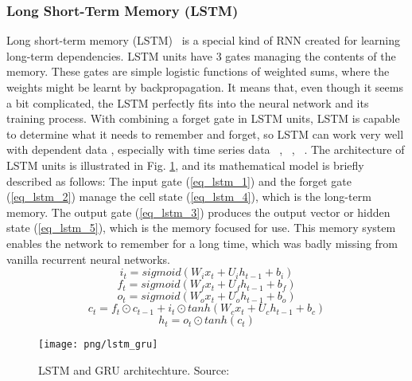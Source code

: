 \documentclass[../main.tex]{subfiles}
\begin{document}
\subsubsection{Long Short-Term Memory (LSTM)}
	Long short-term memory (LSTM)~\cite{hochreiter1997long} is a special kind of RNN created for learning long-term dependencies. LSTM units have 3 gates managing the contents of the memory. These gates are simple logistic functions of weighted sums, where the weights might be learnt by backpropagation. It means that, even though it seems a bit complicated, the LSTM perfectly fits into the neural network and its training process. With combining a forget gate in LSTM units, LSTM is capable to determine what it needs to remember and forget, so LSTM can work very well with dependent data , especially with time series data ~\cite{gers2002applying}, ~\cite{guo2016robust}, ~\cite{fu2016using}. The architecture of LSTM units is illustrated in Fig. \ref{model_lstm_gru}, and its mathematical model is briefly described as follows:
	 The input gate (\ref{eq_lstm_1}) and the forget gate (\ref{eq_lstm_2}) manage the cell state (\ref{eq_lstm_4}), which is the long-term memory. The output gate (\ref{eq_lstm_3}) produces the output vector or hidden state (\ref{eq_lstm_5}), which is the memory focused for use. This memory system enables the network to remember for a long time, which was badly missing from vanilla recurrent neural networks. 
\begin{equation}\label{eq_lstm_1}
i_t = sigmoid(W_ix_t + U_ih_{t-1}+b_i)
\end{equation}
\begin{equation}\label{eq_lstm_2}
f_t = sigmoid(W_fx_t + U_fh_{t-1}+b_f)
\end{equation}
\begin{equation}\label{eq_lstm_3}
o_t = sigmoid(W_ox_t + U_oh_{t-1}+b_o)
\end{equation}
\begin{equation}\label{eq_lstm_4}
c_t = f_t \odot c_{t-1} + i_t \odot tanh(W_cx_t + U_ch_{t-1} + b_c)
\end{equation}
\begin{equation}\label{eq_lstm_5}
h_t = o_t \odot tanh(c_t)
\end{equation}
\begin{figure}[!ht] 
   \centering
   \texttt{[image: png/lstm\_gru]}
  \caption{LSTM and GRU architechture. Source: \cite{michael2018lstm}} 
  \label{model_lstm_gru} 
\end{figure}
\end{document}
